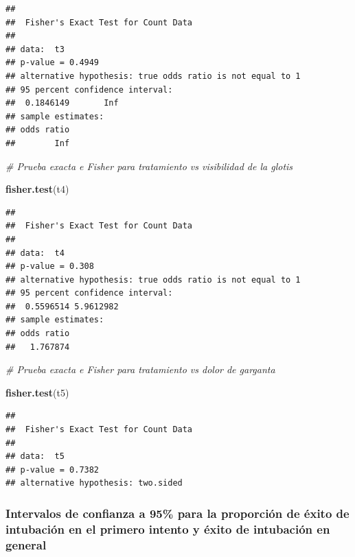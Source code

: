 \documentclass[
]{article}
\newenvironment{Shaded}{\begin{snugshade}}{\end{snugshade}}
\newcommand{\CommentTok}[1]{\textcolor[rgb]{0.56,0.35,0.01}{\textit{#1}}}
\newcommand{\FunctionTok}[1]{\textcolor[rgb]{0.13,0.29,0.53}{\textbf{#1}}}
\newcommand{\NormalTok}[1]{#1}
\begin{document}
\begin{verbatim}
## 
##  Fisher's Exact Test for Count Data
## 
## data:  t3
## p-value = 0.4949
## alternative hypothesis: true odds ratio is not equal to 1
## 95 percent confidence interval:
##  0.1846149       Inf
## sample estimates:
## odds ratio 
##        Inf
\end{verbatim}

\begin{Shaded}
\begin{Highlighting}[]
\CommentTok{\# Prueba exacta e Fisher para tratamiento vs visibilidad de la glotis}

\FunctionTok{fisher.test}\NormalTok{(t4)}
\end{Highlighting}
\end{Shaded}

\begin{verbatim}
## 
##  Fisher's Exact Test for Count Data
## 
## data:  t4
## p-value = 0.308
## alternative hypothesis: true odds ratio is not equal to 1
## 95 percent confidence interval:
##  0.5596514 5.9612982
## sample estimates:
## odds ratio 
##   1.767874
\end{verbatim}

\begin{Shaded}
\begin{Highlighting}[]
\CommentTok{\# Prueba exacta e Fisher para tratamiento vs dolor de garganta}

\FunctionTok{fisher.test}\NormalTok{(t5)}
\end{Highlighting}
\end{Shaded}

\begin{verbatim}
## 
##  Fisher's Exact Test for Count Data
## 
## data:  t5
## p-value = 0.7382
## alternative hypothesis: two.sided
\end{verbatim}

\hypertarget{intervalos-de-confianza-a-95-para-la-proporciuxf3n-de-uxe9xito-de-intubaciuxf3n-en-el-primero-intento-y-uxe9xito-de-intubaciuxf3n-en-general}{%
\subsubsection{Intervalos de confianza a 95\% para la proporción de
éxito de intubación en el primero intento y éxito de intubación en
general}\label{intervalos-de-confianza-a-95-para-la-proporciuxf3n-de-uxe9xito-de-intubaciuxf3n-en-el-primero-intento-y-uxe9xito-de-intubaciuxf3n-en-general}}
\end{document}
